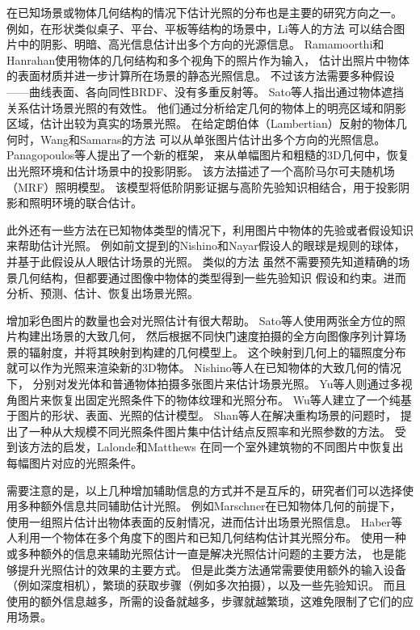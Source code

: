 在已知场景或物体几何结构的情况下估计光照的分布也是主要的研究方向之一。
例如，在形状类似桌子、平台、平板等结构的场景中，Li等人\cite{li2003multiple}的方法
可以结合图片中的阴影、明暗、高光信息估计出多个方向的光源信息。
Ramamoorthi和Hanrahan\cite{ramamoorthi2001signal}使用物体的几何结构和多个视角下的照片作为输入，
估计出照片中物体的表面材质并进一步计算所在场景的静态光照信息。
不过该方法需要多种假设——曲线表面、各向同性BRDF、没有多重反射等。
Sato等人\cite{sato2003illumination}指出通过物体遮挡关系估计场景光照的有效性。
他们通过分析给定几何的物体上的明亮区域和阴影区域，估计出较为真实的场景光照。
在给定朗伯体（Lambertian）反射的物体几何时，Wang和Samaras\cite{wang2002estimation}的方法
可以从单张图片估计出多个方向的光照信息。
Panagopoulos等人\cite{panagopoulos2011illumination}提出了一个新的框架，
来从单幅图片和粗糙的3D几何中，恢复出光照环境和估计场景中的投影阴影。
该方法描述了一个高阶马尔可夫随机场（MRF）照明模型。
该模型将低阶阴影证据与高阶先验知识相结合，用于投影阴影和照明环境的联合估计。

此外还有一些方法在已知物体类型的情况下，利用图片中物体的先验或者假设知识来帮助估计光照。
例如前文提到的Nishino和Nayar\cite{nishino2004eyes}假设人的眼球是规则的球体，
并基于此假设从人眼估计场景的光照。
类似的方法\cite{barron2015shape, lopez2010compositing, rematas2016deep}
虽然不需要预先知道精确的场景几何结构，但都要通过图像中物体的类型得到一些先验知识
假设和约束。进而分析、预测、估计、恢复出场景光照。

增加彩色图片的数量也会对光照估计有很大帮助。
Sato等人\cite{sato1999acquiring}使用两张全方位的照片构建出场景的大致几何，
然后根据不同快门速度拍摄的全方向图像序列计算场景的辐射度，并将其映射到构建的几何模型上。
这个映射到几何上的辐照度分布就可以作为光照来渲染新的3D物体。
Nishino等人\cite{nishino2001determining, nishino2005re}在已知物体的大致几何的情况下，
分别对发光体和普通物体拍摄多张图片来估计场景光照。
Yu等人\cite{yu2006sparse}则通过多视角图片来恢复出固定光照条件下的物体纹理和光照分布。
Wu等人\cite{wu2011high}建立了一个纯基于图片的形状、表面、光照的估计模型。
Shan等人\cite{shan2013visual}在解决重构场景的问题时，
提出了一种从大规模不同光照条件图片集中估计结点反照率和光照参数的方法。
受到该方法的启发，Lalonde和Matthews\cite{lalonde2014lighting}
在同一个室外建筑物的不同图片中恢复出每幅图片对应的光照条件。

需要注意的是，以上几种增加辅助信息的方式并不是互斥的，研究者们可以选择使用多种额外信息共同辅助估计光照。
例如Marschner\cite{marschner1997inverse}在已知物体几何的前提下，
使用一组照片估计出物体表面的反射情况，进而估计出场景光照信息。
Haber等人\cite{haber2009relighting}利用一个物体在多个角度下的图片和已知几何结构估计其光照分布。
使用一种或多种额外的信息来辅助光照估计一直是解决光照估计问题的主要方法，
也是能够提升光照估计的效果的主要方式。
但是此类方法通常需要使用额外的输入设备（例如深度相机），繁琐的获取步骤（例如多次拍摄），以及一些先验知识。
而且使用的额外信息越多，所需的设备就越多，步骤就越繁琐，这难免限制了它们的应用场景。

